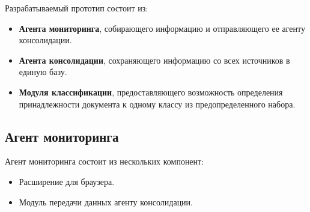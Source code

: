 \documentclass[russian, utf8, emptystyle]{eskdtext}
\begin{document}
Разрабатываемый прототип состоит из:
\begin{itemize}
		\item {\bf Агента мониторинга}, собирающего информацию и отправляющего ее агенту консолидации.
		\item{\bf Агента консолидации}, сохраняющего информацию со всех источников в единую базу.
		\item{\bf Модуля классификации}, предоставляющего возможность определения принадлежности документа к одному классу из предопределенного набора.
\end{itemize}
\subsection{Агент мониторинга}

Агент мониторинга состоит из нескольких компонент:
\begin{itemize}
	\item Расширение для браузера.
	\item Модуль передачи данных агенту консолидации.
\end{itemize}
\end{document}
